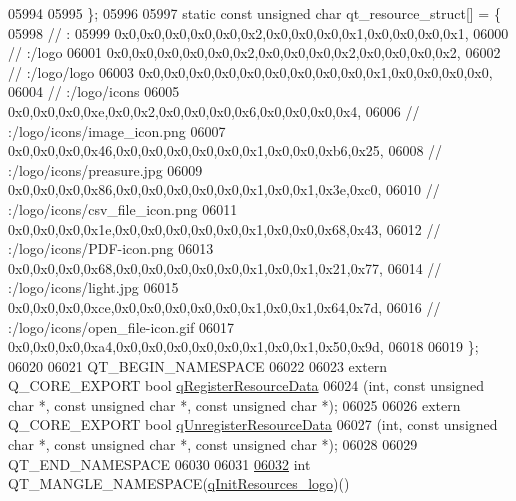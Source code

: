 \begin{DoxyCode}
05994   
05995 \};
05996 
05997 \textcolor{keyword}{static} \textcolor{keyword}{const} \textcolor{keywordtype}{unsigned} \textcolor{keywordtype}{char} qt\_resource\_struct[] = \{
05998   \textcolor{comment}{// :}
05999   0x0,0x0,0x0,0x0,0x0,0x2,0x0,0x0,0x0,0x1,0x0,0x0,0x0,0x1,
06000   \textcolor{comment}{// :/logo}
06001   0x0,0x0,0x0,0x0,0x0,0x2,0x0,0x0,0x0,0x2,0x0,0x0,0x0,0x2,
06002   \textcolor{comment}{// :/logo/logo}
06003   0x0,0x0,0x0,0x0,0x0,0x0,0x0,0x0,0x0,0x1,0x0,0x0,0x0,0x0,
06004   \textcolor{comment}{// :/logo/icons}
06005   0x0,0x0,0x0,0xe,0x0,0x2,0x0,0x0,0x0,0x6,0x0,0x0,0x0,0x4,
06006   \textcolor{comment}{// :/logo/icons/image\_icon.png}
06007   0x0,0x0,0x0,0x46,0x0,0x0,0x0,0x0,0x0,0x1,0x0,0x0,0xb6,0x25,
06008   \textcolor{comment}{// :/logo/icons/preasure.jpg}
06009   0x0,0x0,0x0,0x86,0x0,0x0,0x0,0x0,0x0,0x1,0x0,0x1,0x3e,0xc0,
06010   \textcolor{comment}{// :/logo/icons/csv\_file\_icon.png}
06011   0x0,0x0,0x0,0x1e,0x0,0x0,0x0,0x0,0x0,0x1,0x0,0x0,0x68,0x43,
06012   \textcolor{comment}{// :/logo/icons/PDF-icon.png}
06013   0x0,0x0,0x0,0x68,0x0,0x0,0x0,0x0,0x0,0x1,0x0,0x1,0x21,0x77,
06014   \textcolor{comment}{// :/logo/icons/light.jpg}
06015   0x0,0x0,0x0,0xce,0x0,0x0,0x0,0x0,0x0,0x1,0x0,0x1,0x64,0x7d,
06016   \textcolor{comment}{// :/logo/icons/open\_file-icon.gif}
06017   0x0,0x0,0x0,0xa4,0x0,0x0,0x0,0x0,0x0,0x1,0x0,0x1,0x50,0x9d,
06018 
06019 \};
06020 
06021 QT\_BEGIN\_NAMESPACE
06022 
06023 \textcolor{keyword}{extern} Q\_CORE\_EXPORT \textcolor{keywordtype}{bool} \hyperlink{a00041_ab3bec3d1e679084be46edc41e4c91bc1}{qRegisterResourceData}
06024     (\textcolor{keywordtype}{int}, \textcolor{keyword}{const} \textcolor{keywordtype}{unsigned} \textcolor{keywordtype}{char} *, \textcolor{keyword}{const} \textcolor{keywordtype}{unsigned} \textcolor{keywordtype}{char} *, \textcolor{keyword}{const} \textcolor{keywordtype}{unsigned} \textcolor{keywordtype}{char} *);
06025 
06026 \textcolor{keyword}{extern} Q\_CORE\_EXPORT \textcolor{keywordtype}{bool} \hyperlink{a00041_ad65f8bca8010dd1fd135a28a085c6d03}{qUnregisterResourceData}
06027     (\textcolor{keywordtype}{int}, \textcolor{keyword}{const} \textcolor{keywordtype}{unsigned} \textcolor{keywordtype}{char} *, \textcolor{keyword}{const} \textcolor{keywordtype}{unsigned} \textcolor{keywordtype}{char} *, \textcolor{keyword}{const} \textcolor{keywordtype}{unsigned} \textcolor{keywordtype}{char} *);
06028 
06029 QT\_END\_NAMESPACE
06030 
06031 
\hypertarget{a00041_source_l06032}{}\hyperlink{a00041_a26f25d34489dcef5b740853d8506af1c}{06032} \textcolor{keywordtype}{int} QT\_MANGLE\_NAMESPACE(\hyperlink{a00041_a26f25d34489dcef5b740853d8506af1c}{qInitResources\_logo})()

\end{DoxyCode}

